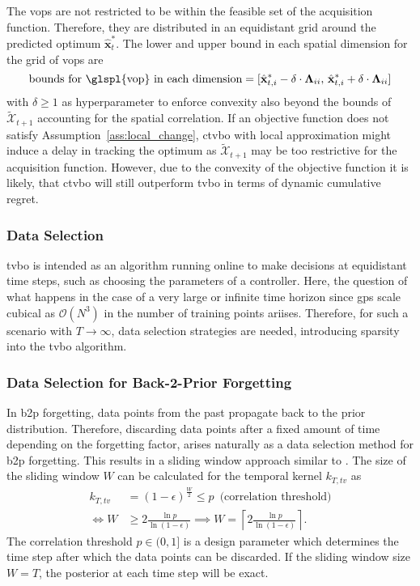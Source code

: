 The \glspl{vop} are not restricted to be within the feasible set of the acquisition function. Therefore, they are distributed in an equidistant grid around the predicted optimum $\hat{\mathbf{x}}^*_{t}$. The lower and upper bound in each spatial dimension for the grid of \glspl{vop} are
\begin{equation}
    \text{bounds for \glspl{vop} in each dimension} = [\hat{\mathbf{x}}^*_{t,i} - \delta \cdot \boldsymbol\Lambda_{ii}, \, \hat{\mathbf{x}}^*_{t,i} + \delta \cdot \boldsymbol\Lambda_{ii}]
    \label{eq:delta}
\end{equation}
with $\delta \geq 1$ as hyperparameter to enforce convexity also beyond the bounds of $\tilde{\mathcal{X}}_{t+1}$ accounting for the spatial correlation. If an objective function does not satisfy Assumption~\ref{ass:local_change}, \gls{ctvbo} with local approximation might induce a delay in tracking the optimum as $\tilde{\mathcal{X}}_{t+1}$ may be too restrictive for the acquisition function. However, due to the convexity of the objective function it is likely, that \gls{ctvbo} will still outperform \gls{tvbo} in terms of dynamic cumulative regret.

\subsubsection{Data Selection}
\label{sec:data_selection}

\gls{tvbo} is intended as an algorithm running online to make decisions at equidistant time steps, such as choosing the parameters of a controller. Here, the question of what happens in the case of a very large or infinite time horizon since \glspl{gp} scale cubical as $\mathcal{O}(N^3)$ in the number of training points ariises. Therefore, for such a scenario with $T \to \infty$, data selection strategies are needed, introducing sparsity into the \gls{tvbo} algorithm.

\subsubsection{Data Selection for Back-2-Prior Forgetting}

In \gls{b2p} forgetting, data points from the past propagate back to the prior distribution. Therefore, discarding data points after a fixed amount of time depending on the forgetting factor, arises naturally as a data selection method for \gls{b2p} forgetting. This results in a sliding window approach similar to \textcite{Meier_2016}. The size of the sliding window $W$ can be calculated for the temporal kernel $k_{T,tv}$ as
\begin{align}
    k_{T,tv} &= (1-\epsilon)^{\frac{W}{2}} \leq p \,\text{ (correlation threshold)} \\
    \Leftrightarrow W &\geq 2 \frac{\ln{p}}{\ln{(1-\epsilon)}} \implies W = \left\lceil 2 \frac{\ln{p}}{\ln{(1-\epsilon)}} \right\rceil.
    \label{eq:sliding_window}
\end{align}
The correlation threshold $p\in(0,1]$ is a design parameter which determines the time step after which the data points can be discarded.
If the sliding window size $W=T$, the posterior at each time step will be exact.

